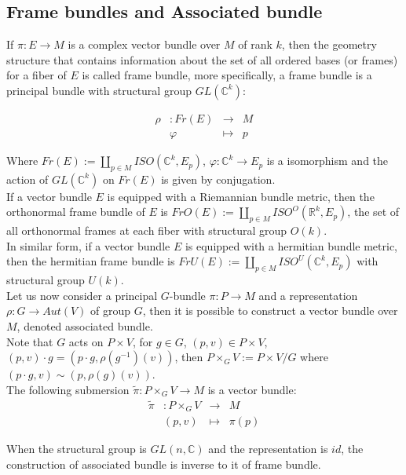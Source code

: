 \subsection{Frame bundles and Associated bundle}
If $\pi:E \to M$ is a complex vector bundle over $M$ of rank $k$, then the geometry structure that contains information about the set of all ordered bases (or frames) for a fiber of $E$ is called frame bundle, more specifically, a frame bundle is a principal bundle with structural group $GL(\mathbb{C}^{k})$:

	$$\begin{array}{crcl}
\rho &: Fr(E) & \longrightarrow & M \\
& \varphi & \mapsto & p
\end{array}$$

Where $\displaystyle{Fr(E):=\coprod_{p\in M} ISO(\mathbb{C}^{k},E_{p})}$, $\varphi: \mathbb{C}^{k} \to E_{p}$ is a isomorphism and the action of $GL(\mathbb{C}^{k})$ on $Fr(E)$ is given by conjugation.\\

If a vector bundle $E$ is equipped with a Riemannian bundle metric, then the orthonormal frame bundle of $E$ is $\displaystyle{Fr{O}(E):=\coprod_{p\in M} ISO^{O}(\mathbb{R}^{k},E_{p})}$, the set of all orthonormal frames at each fiber with structural group $O(k)$.\\
In similar form, if a vector bundle $E$ is equipped with a hermitian bundle metric, then the hermitian frame bundle is  $\displaystyle{Fr{U}(E):=\coprod_{p\in M} ISO^{U}(\mathbb{C}^{k},E_{p})}$ with structural group $U(k)$.\\

Let us now consider a principal $G$-bundle $\pi :P \to M$ and a representation $\rho :G \to Aut(V)$ of group $G$, then it is possible to construct a vector bundle over $M$, denoted associated bundle.\\
Note that $G$ acts on $P \times V$, for $g \in G$, $(p,v) \in P\times V$, $(p,v) \cdot g= (p\cdot g, \rho(g^{-1})(v))$, then $P \times_{G} V:= P \times V/G$ where $(p\cdot g,v) \sim (p,\rho(g)(v))$.\\
The following submersion $\tilde{\pi}:P \times_{G} V \to M$  is a vector bundle:
	$$\begin{array}{crcl}
\tilde{\pi} &: P \times_{G} V & \longrightarrow & M \\
& (p,v) & \mapsto & \pi(p)
\end{array}$$

When the structural group is  $GL(n,\mathbb{C})$ and the representation is $id$, the construction of associated bundle is inverse to it of frame bundle. 

